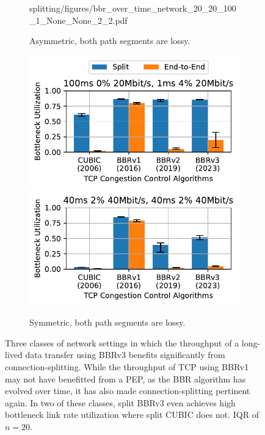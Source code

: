 \begin{figure}[t!]
\begin{subfigure}[b]{0.49\linewidth}
         {splitting/figures/bbr_over_time_network_20_20_100_1_None_None_2_2.pdf}
        \captionsetup{skip=0pt}
        \caption{Asymmetric, both path segments are lossy.}
        \label{fig:splitting:bbr-over-time:class2}
    \end{subfigure}
    \begin{subfigure}[b]{0.49\linewidth}
        \centering
        \includegraphics[width=\linewidth, trim=0 155 0 0]
         {splitting/figures/bbr_over_time_network_20_20_100_1_None_None_0_4.pdf}
        \includegraphics[width=\linewidth]
         {splitting/figures/bbr_over_time_network_40_40_40_40_None_None_2_2.pdf}
        \captionsetup{skip=0pt}
        \caption{Symmetric, both path segments are lossy.}
        \label{fig:splitting:bbr-over-time:class3}
    \end{subfigure}
    \caption{Three classes of network settings in which the throughput of a
     long-lived data transfer using BBRv3 benefits significantly from
     connection-splitting. While the throughput of TCP using BBRv1 may not have
     benefitted from a PEP, as the BBR algorithm has evolved over time, it has
     also made connection-splitting pertinent again. In two of these classes,
     split BBRv3 even achieves high bottleneck link rate utilization where split
     CUBIC does not. IQR of $n=20$.}
    \label{fig:splitting:bbr-over-time}
\end{figure}
